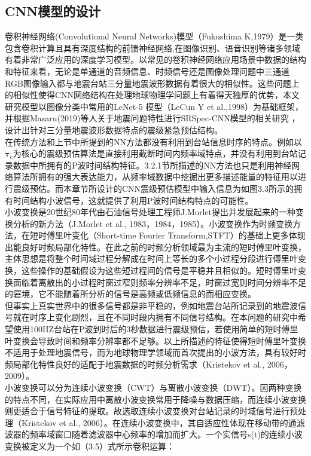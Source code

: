 \subsection{CNN模型的设计}
\indent 卷积神经网络(Convolutional Neural Networks)模型（Fukushima K,1979）是一类包含卷积计算且具有深度结构的前馈神经网络,在图像识别、语音识别等诸多领域有着非常广泛应用的深度学习模型。以常见的卷积神经网络应用场景中数据的结构和特征来看，无论是单通道的音频信息、时频信号还是图像处理问题中三通道RGB图像输入都与地震台站三分量地震波形数据有着很大的相似性。这些问题上的相似性使得CNN网络结构在处理地球物理学问题上有着得天独厚的优势，本文研究模型以图像分类中常用的LeNet-5 模型（LeCun Y et al.,1998）为基础框架，并根据Masaru(2019)等人关于地震问题特性进行SRSpec-CNN模型的相关研究 ，设计出针对三分量地震波形数据特点的震级紧急预估结构。\\
\indent 在传统方法和上节中所提到的NN方法都没有利用到台站信息时序的特点。例如以$\mathbf{\tau}_{\mathrm{c}}$为核心的震级预估算法是直接利用截断时间内频率域特点，并没有利用到台站记录数据中所拥有的P波时间结构特征。3.2.1节所描述的NN方法也只是利用神经网络算法所拥有的强大表达能力，从频率域数据中挖掘出更多描述能量的特征用以进行震级预估。而本章节所设计的CNN震级预估模型中输入信息为如图3.3所示的拥有时间结构小波信号，这就提供了利用P波时间结构特点的可能性。\\
\indent 小波变换是20世纪80年代由石油信号处理工程师J.Morlet提出并发展起来的一种变换分析的新方法（J.Morlet et al., 1983，1984，1985）。小波变换作为时频变换方法，在短时傅里叶变化（Short-time Fourier Transform,STFT）的基础上更多体现出能良好时频局部化特性。在此之前的时频分析领域最为主流的短时傅里叶变换，主体思想是将整个时间域过程分解成在时间上等长的多个小过程分段进行傅里叶变换，这些操作的基础假设为这些短过程间的信号是平稳并且相似的。短时傅里叶变换面临着离散出的小过程时窗过窄则频率分辨率不足，时窗过宽则时间分辨率不足的窘境，它不能随着所分析的信号是高频或低频信息的而相应变换。\\
\indent 但事实上真实世界中的很多信号都是非平稳的，例如地震台站所记录到的地震波信号就在时序上变化剧烈，且在不同时段内拥有不同信号结构。在本问题的研究中希望使用100HZ台站在P波到时后的3秒数据进行震级预估，若使用简单的短时傅里叶变换会导致时间和频率分辨率都不足够。以上所描述的特征使得短时傅里叶变换不适用于处理地震信号，而为地球物理学领域而首次提出的小波方法，具有较好时频局部化特性良好的适配于地震数据的时频分析需求（Kristekov et al., 2006，2009）。\\
\indent 小波变换可以分为连续小波变换（CWT）与离散小波变换（DWT）。因两种变换的特点不同，在实际应用中离散小波变换常用于降噪与数据压缩，而连续小波变换则更适合于信号特征的提取。故选取连续小波变换对台站记录的时域信号进行预处理（Kristekov et al., 2006）。在连续小波变换中，其自适应性体现在移动带的通滤波器的频率域窗口随着滤波器中心频率的增加而扩大。一个实信号s(t)的连续小波变换被定义为一个如（3.5）式所示卷积运算：\\
